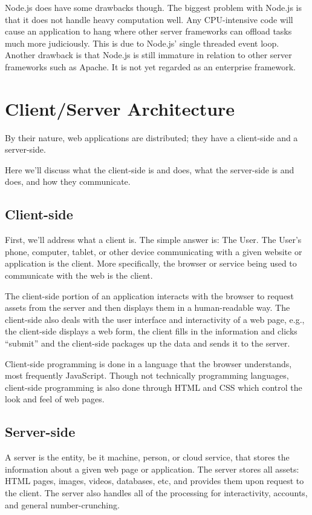 \documentclass[12pt]{ucthesis}
\begin{document}
Node.js does have some drawbacks though. The biggest problem with Node.js is that it does not handle heavy computation well. Any CPU-intensive code will cause an application to hang where other server frameworks can offload tasks much more judiciously. This is due to Node.js' single threaded event loop. Another drawback is that Node.js is still immature in relation to other server frameworks such as Apache. It is not yet regarded as an enterprise framework.

\section{Client/Server Architecture}
By their nature, web applications are distributed; they have a client-side and a server-side.

Here we'll discuss what the client-side is and does, what the server-side is and does, and how they communicate.

\subsection{Client-side}
First, we'll address what a client is. The simple answer is: The User. The User's phone, computer, tablet, or other device communicating with a given website or application is the client. More specifically, the browser or service being used to communicate with the web is the client. 

The client-side portion of an application interacts with the browser to request assets from the server and then displays them in a human-readable way. The client-side also deals with the user interface and interactivity of a web page, e.g., the client-side displays a web form, the client fills in the information and clicks ``submit'' and the client-side packages up the data and sends it to the server.

Client-side programming is done in a language that the browser understands, most frequently JavaScript. Though not technically programming languages, client-side programming is also done through HTML and CSS which control the look and feel of web pages.

\subsection{Server-side}
A server is the entity, be it machine, person, or cloud service, that stores the information about a given web page or application. The server stores all assets: HTML pages, images, videos, databases, etc, and provides them upon request to the client. The server also handles all of the processing for interactivity, accounts, and general number-crunching.
\end{document}
